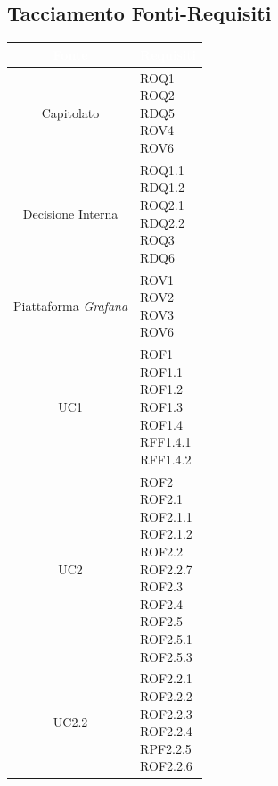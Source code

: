 \subsection{Tacciamento Fonti-Requisiti}\label{Tracciamento}
\begin{center}
\begin{longtable}[c]{|c|m{}|}
\hline
\rowcolor{bluelogo}\textbf{\textcolor{white}{Fonte}} & \textbf{\textcolor{white}{Requisiti}}\\
\hline \hline
\endhead
Capitolato & \makecell{ROQ1\\ROQ2\\RDQ5\\ROV4\\ROV6}\\
\hline
\rowcolor{grigio}Decisione Interna & \makecell{ROQ1.1\\RDQ1.2\\ROQ2.1\\RDQ2.2\\ROQ3\\RDQ6}\\
\hline
Piattaforma \textit{Grafana} & \makecell{ROV1\\ROV2\\ROV3\\ROV6}\\
\hline
\rowcolor{grigio}UC1 & \makecell{ROF1\\ROF1.1\\ROF1.2\\ROF1.3\\ROF1.4\\RFF1.4.1\\RFF1.4.2}\\
\hline
UC2 & \makecell{ROF2\\ROF2.1\\ROF2.1.1\\ROF2.1.2\\ROF2.2\\ROF2.2.7\\ROF2.3\\ROF2.4\\ROF2.5\\ROF2.5.1\\ROF2.5.3}\\
\hline
\rowcolor{grigio}UC2.2 & \makecell{ROF2.2.1\\ROF2.2.2\\ROF2.2.3\\ROF2.2.4\\RPF2.2.5\\ROF2.2.6}\\

\end{longtable}
\end{center}

